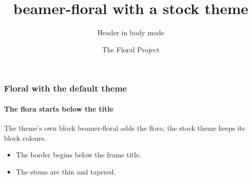 \documentclass[aspectratio=169]{beamer}
\title{beamer-floral with a stock theme}
\subtitle{Header in body mode}
\author{The Floral Project}
\institute{Procedural illustration and typography}
\date{}
\begin{document}
\begin{frame}[plain]
  \titlepage
\end{frame}

\begin{frame}
  \frametitle{Floral with the default theme}
  \framesubtitle{The flora starts below the title}
  \begin{block}{The theme's own block}
    beamer-floral adds the flora; the stock theme keeps its block colours.
  \end{block}
  \begin{itemize}
    \item The border begins below the frame title.
    \item The stems are thin and tapered.
  \end{itemize}
\end{frame}
\end{document}
